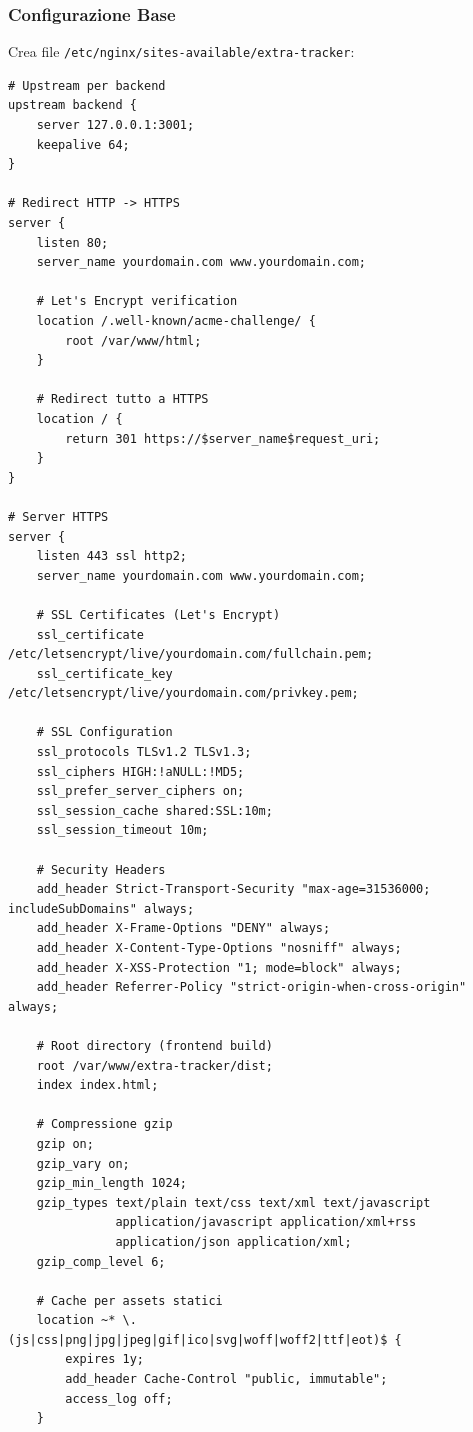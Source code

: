 \documentclass[11pt,a4paper]{article}
\newcommand{\code}[1]{\texttt{#1}}
\begin{document}
\subsubsection{Configurazione Base}

Crea file \code{/etc/nginx/sites-available/extra-tracker}:

\begin{lstlisting}[caption=/etc/nginx/sites-available/extra-tracker]
# Upstream per backend
upstream backend {
    server 127.0.0.1:3001;
    keepalive 64;
}

# Redirect HTTP -> HTTPS
server {
    listen 80;
    server_name yourdomain.com www.yourdomain.com;
    
    # Let's Encrypt verification
    location /.well-known/acme-challenge/ {
        root /var/www/html;
    }
    
    # Redirect tutto a HTTPS
    location / {
        return 301 https://$server_name$request_uri;
    }
}

# Server HTTPS
server {
    listen 443 ssl http2;
    server_name yourdomain.com www.yourdomain.com;
    
    # SSL Certificates (Let's Encrypt)
    ssl_certificate /etc/letsencrypt/live/yourdomain.com/fullchain.pem;
    ssl_certificate_key /etc/letsencrypt/live/yourdomain.com/privkey.pem;
    
    # SSL Configuration
    ssl_protocols TLSv1.2 TLSv1.3;
    ssl_ciphers HIGH:!aNULL:!MD5;
    ssl_prefer_server_ciphers on;
    ssl_session_cache shared:SSL:10m;
    ssl_session_timeout 10m;
    
    # Security Headers
    add_header Strict-Transport-Security "max-age=31536000; includeSubDomains" always;
    add_header X-Frame-Options "DENY" always;
    add_header X-Content-Type-Options "nosniff" always;
    add_header X-XSS-Protection "1; mode=block" always;
    add_header Referrer-Policy "strict-origin-when-cross-origin" always;
    
    # Root directory (frontend build)
    root /var/www/extra-tracker/dist;
    index index.html;
    
    # Compressione gzip
    gzip on;
    gzip_vary on;
    gzip_min_length 1024;
    gzip_types text/plain text/css text/xml text/javascript 
               application/javascript application/xml+rss 
               application/json application/xml;
    gzip_comp_level 6;
    
    # Cache per assets statici
    location ~* \.(js|css|png|jpg|jpeg|gif|ico|svg|woff|woff2|ttf|eot)$ {
        expires 1y;
        add_header Cache-Control "public, immutable";
        access_log off;
    }
    

\end{lstlisting}
\end{document}
